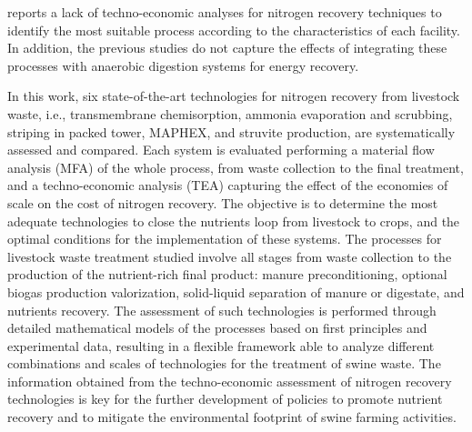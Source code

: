 \begin{refsection}[referencesCh6]
\citet{beckinghausen2020removal} reports a lack of techno-economic analyses for nitrogen recovery techniques to identify the most suitable process according to the characteristics of each facility. In addition, the previous studies do not capture the effects of integrating these processes with anaerobic digestion systems for energy recovery.

In this work, six state-of-the-art technologies for nitrogen recovery from livestock waste, i.e., transmembrane  chemisorption, ammonia evaporation and scrubbing, striping in packed tower, MAPHEX, and struvite production, are systematically assessed and compared. Each system is evaluated performing a material flow analysis (MFA) of the whole process, from waste collection to the final treatment, and a techno-economic analysis (TEA) capturing the effect of the economies of scale on the cost of nitrogen recovery.
The objective is to determine the most adequate technologies to close the nutrients loop from livestock to crops, and the optimal conditions for the implementation of
these systems. The processes for livestock waste treatment studied involve all stages from waste collection to the production of the nutrient-rich final product: manure preconditioning, optional biogas production valorization, solid-liquid separation of manure or digestate, and nutrients recovery. The assessment of such technologies is performed through detailed mathematical models of the processes based on first principles and experimental data, resulting in a flexible framework able to analyze different combinations and scales of technologies for the treatment of swine waste. The information obtained from the techno-economic assessment of nitrogen recovery technologies is key for the further development of policies to promote nutrient recovery and to mitigate the environmental footprint of swine farming activities.

\end{refsection}
